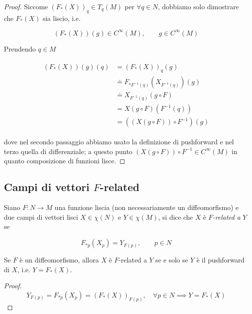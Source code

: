 \begin{proof}
	Siccome $ (F_{*} (X))_{q} \in T_{q}(M) $ per $ \forall q \in N $, dobbiamo solo dimostrare che $ F_{*}(X) $ sia liscio, i.e.
	
	\begin{equation}
		(F_{*}(X))(g) \in C^{\infty}(M), \qquad g \in C^{\infty}(M)
	\end{equation}

	Prendendo $ q \in M $
	
	\begin{align}
		\begin{split}
			(F_{*}(X))(g)(q) &= (F_{*}(X))_{q}(g)\\
			&\doteq F_{*F^{-1}(q)} (X_{F^{-1}(q)})(g)\\
			&\doteq X_{F^{-1}(q)} (g \circ F)\\
			&= X (g \circ F)(F^{-1}(q))\\
			&= ((X (g \circ F)) \circ F^{-1})(g)
		\end{split}
	\end{align}

	dove nel secondo passaggio abbiamo usato la definizione di pushforward e nel terzo quella di differenziale; a questo punto $ (X (g \circ F)) \circ F^{-1} \in C^{\infty}(M) $ in quanto composizione di funzioni lisce.
\end{proof}

\subsection{Campi di vettori $ F $-related}

Siano $ F : N \to M $ una funzione liscia (non necessariamente un diffeomorfismo) e due campi di vettori lisci $ X \in \chi(N) $ e $ Y \in \chi(M) $, si dice che $ X $ è $ F $\textit{-related a} $ Y $ se

\begin{equation}
	F_{*p}(X_{p}) = Y_{F(p)}, \qquad p \in N
\end{equation}

\begin{remark}
	Se $ F $ è un diffeomorfismo, allora $ X $ è $ F $-related a $ Y $ se e solo se $ Y $ è il pushforward di $ X $, i.e. $ Y = F_{*}(X) $.
\end{remark}

\begin{proof}
	\begin{equation}
		Y_{F(p)} = F_{*p}(X_{p}) = (F_{*}(X))_{F(p)}, \quad \forall p \in N %
		\implies%
		Y = F_{*}(X)
	\end{equation}
\end{proof}

